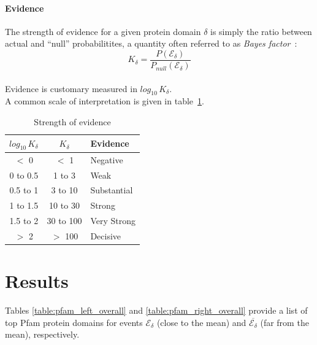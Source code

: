 \documentclass[12pt]{article}
\begin{document}
\paragraph{Evidence}
The strength of evidence for a given protein domain $\delta$ is simply the ratio between actual and ``null'' probabilitites, a quantity often referred to as \textit{Bayes factor}~\cite{kass1995bayes}:
%
\begin{equation}
K_{\delta} = \frac{P(\mathscr{E_{\delta}})}{P_{null}(\mathscr{E_{\delta}})}
\end{equation}
%
\\
Evidence is customary measured in $log_{10}\,K_{\delta}$.\\ 
A common scale of interpretation is given in table~\ref{table:evidence}.

\pagebreak

\begin{table}
	\centering
    \begin{tabular}{c c l}
        \toprule
        $log_{10}\,K_{\delta}$ & $K_{\delta}$ & Evidence \\
        \midrule
        $<$ 0 & $<$ 1 & Negative \\
        0 to 0.5 & 1 to 3 & Weak \\
        0.5 to 1 & 3 to 10 & Substantial \\
        1 to 1.5 & 10 to 30 & Strong \\
        1.5 to 2 & 30 to 100 & Very Strong \\
        $>$ 2 & $>$ 100 & Decisive \\
        \bottomrule
    \end{tabular}
    \caption{Strength of evidence}
    \label{table:evidence}
\end{table}

\section{Results}

Tables \ref{table:pfam_left_overall} and \ref{table:pfam_right_overall} provide a list of top Pfam protein domains for events $\mathscr{E_{\delta}}$ (close to the mean) and $\overline{\mathscr{E_{\delta}}}$ (far from the mean), respectively.
\end{document}
